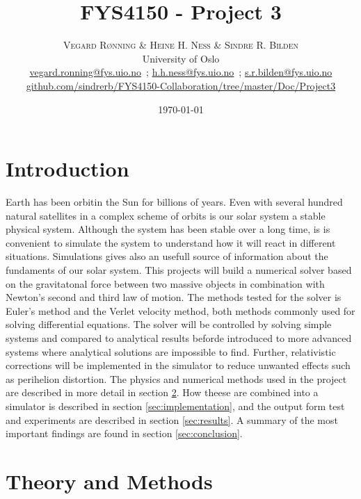 \documentclass[twoside,twocolumn]{article}
\title{FYS4150 - Project 3} %
\author{%
	\textsc{Vegard R\o{}nning \& Heine H. Ness \& Sindre R. Bilden} \\[1ex] %
	\normalsize University of Oslo \\ %
	\normalsize \href{mailto:vegard.ronning@fys.uio.no}{vegard.ronning@fys.uio.no}\ ; \href{mailto:h.h.ness@fys.uio.no}{h.h.ness@fys.uio.no}\ ; \href{mailto:s.r.bilden@fys.uio.no}{s.r.bilden@fys.uio.no}\\%
	\footnotesize \href{https://github.com/sindrerb/FYS4150-Collaboration/tree/master/Doc/Project3}{github.com/sindrerb/FYS4150-Collaboration/tree/master/Doc/Project3}
}
\date{\today} %
\begin{document}
	
\maketitle

\section{Introduction}
\lettrine[nindent=0em,lines=2]{E}{}arth has been orbitin the Sun for billions of years. Even with several hundred natural satellites in a complex scheme of orbits is our solar system a stable physical system. Although the system has been stable over a long time, is is convenient to simulate the system to understand how it will react in different situations. Simulations gives also an usefull source of information about the fundaments of our solar system. This projects will build a numerical solver based on the gravitatonal force between two massive objects in combination with Newton's second and third law of motion. The methods tested for the solver is Euler's method and the Verlet velocity method, both methods commonly used for solving differential equations. The solver will be controlled by solving simple systems and compared to analytical results beforde introduced to more advanced systems where analytical solutions are impossible to find. Further, relativistic corrections will be implemented in the simulator to reduce unwanted effects such as perihelion distortion. The physics and numerical methods used in the project are described in more detail in section \ref{sec:methods}. How theese are combined into a simulator is described in section \ref{sec:implementation}, and the output form test and experiments are described in section \ref{sec:results}. A summary of the most important findings are found in section \ref{sec:conclusion}.
\section{Theory and Methods}
\label{sec:methods}
\end{document}
